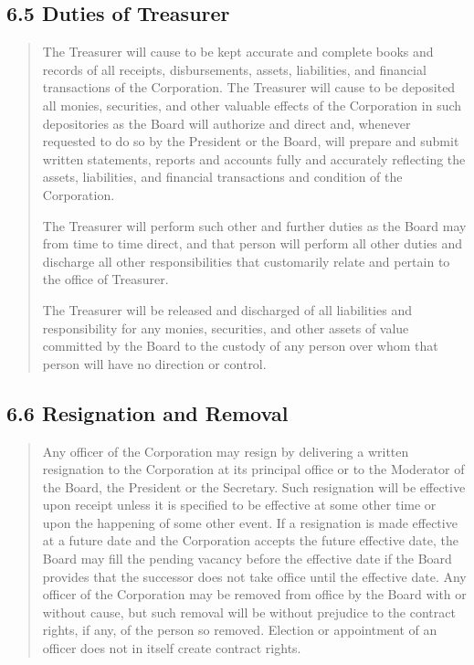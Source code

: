 \documentclass[
]{book}
\begin{document}
\subsection{6.5 Duties of Treasurer}\label{duties-of-treasurer}

\begin{quote}
The Treasurer will cause to be kept accurate and complete books and
records of all receipts, disbursements, assets, liabilities, and
financial transactions of the Corporation. The Treasurer will cause to
be deposited all monies, securities, and other valuable effects of the
Corporation in such depositories as the Board will authorize and
direct and, whenever requested to do so by the President or the Board,
will prepare and submit written statements, reports and accounts fully
and accurately reflecting the assets, liabilities, and financial
transactions and condition of the Corporation.

The Treasurer will perform such other and further duties as the Board
may from time to time direct, and that person will perform all other
duties and discharge all other responsibilities that customarily
relate and pertain to the office of Treasurer.

The Treasurer will be released and discharged of all liabilities and
responsibility for any monies, securities, and other assets of value
committed by the Board to the custody of any person over whom that
person will have no direction or control.
\end{quote}

\subsection{6.6 Resignation and Removal}\label{resignation-and-removal}

\begin{quote}
Any officer of the Corporation may resign by delivering a written
resignation to the Corporation at its principal office or to the
Moderator of the Board, the President or the Secretary. Such
resignation will be effective upon receipt unless it is specified to
be effective at some other time or upon the happening of some other
event. If a resignation is made effective at a future date and the
Corporation accepts the future effective date, the Board may fill the
pending vacancy before the effective date if the Board provides that
the successor does not take office until the effective date. Any
officer of the Corporation may be removed from office by the Board
with or without cause, but such removal will be without prejudice to
the contract rights, if any, of the person so removed. Election or
appointment of an officer does not in itself create contract rights.
\end{quote}
\end{document}
